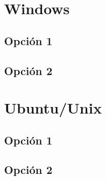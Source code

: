 \documentclass[12pt,letterpaper]{report}
\begin{document}
\section*{Windows}
\subsection*{Opci\'on 1}
\subsection*{Opci\'on 2}
\section*{Ubuntu/Unix}
\subsection*{Opci\'on 1}
\subsection*{Opci\'on 2}
\end{document}
